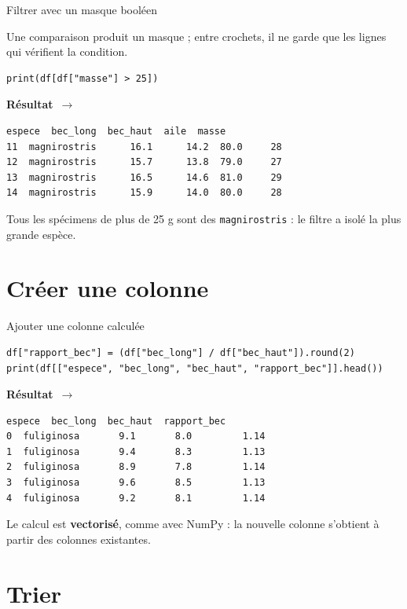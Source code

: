 \documentclass[aspectratio=169,11pt]{beamer}
\newcommand{\resultat}{{\scriptsize\textbf{R\'esultat}~$\rightarrow$}\par\vspace{1pt}}
\begin{document}
\begin{frame}[fragile]{Filtrer avec un masque booléen}
\begin{ucadex}
{\small Une comparaison produit un masque ; entre crochets, il ne garde que les lignes qui vérifient la condition.}
\end{ucadex}
\begin{lstlisting}
print(df[df["masse"] > 25])
\end{lstlisting}
\resultat
\begin{lstlisting}[style=out]
          espece  bec_long  bec_haut  aile  masse
11  magnirostris      16.1      14.2  80.0     28
12  magnirostris      15.7      13.8  79.0     27
13  magnirostris      16.5      14.6  81.0     29
14  magnirostris      15.9      14.0  80.0     28
\end{lstlisting}
{\small Tous les spécimens de plus de 25 g sont des \texttt{magnirostris} : le filtre a isolé la plus grande espèce.}
\end{frame}

\section{Créer une colonne}

\begin{frame}[fragile]{Ajouter une colonne calculée}
\begin{lstlisting}
df["rapport_bec"] = (df["bec_long"] / df["bec_haut"]).round(2)
print(df[["espece", "bec_long", "bec_haut", "rapport_bec"]].head())
\end{lstlisting}
\resultat
\begin{lstlisting}[style=out]
       espece  bec_long  bec_haut  rapport_bec
0  fuliginosa       9.1       8.0         1.14
1  fuliginosa       9.4       8.3         1.13
2  fuliginosa       8.9       7.8         1.14
3  fuliginosa       9.6       8.5         1.13
4  fuliginosa       9.2       8.1         1.14
\end{lstlisting}
{\small Le calcul est \textbf{vectorisé}, comme avec NumPy : la nouvelle colonne s'obtient à partir des colonnes existantes.}
\end{frame}

\section{Trier}
\end{document}
